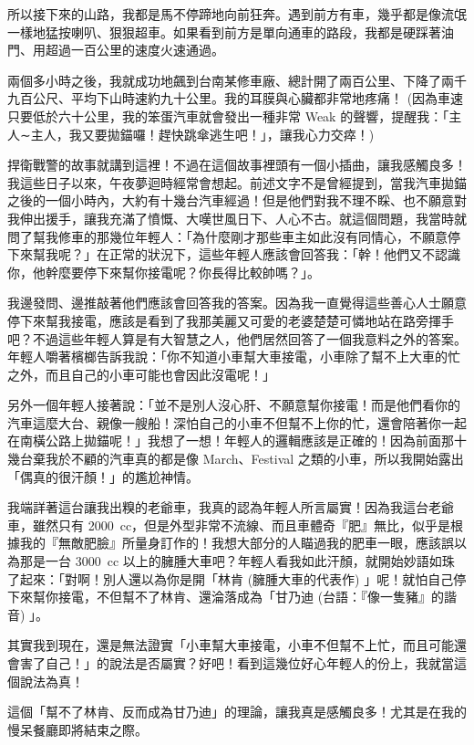 所以接下來的山路，我都是馬不停蹄地向前狂奔。遇到前方有車，幾乎都是像流氓一樣地猛按喇叭、狠狠超車。如果看到前方是單向通車的路段，我都是硬踩著油門、用超過一百公里的速度火速通過。

兩個多小時之後，我就成功地飆到台南某修車廠、總計開了兩百公里、下降了兩千九百公尺、平均下山時速約九十公里。我的耳膜與心臟都非常地疼痛！ (因為車速只要低於六十公里，我的笨蛋汽車就會發出一種非常 Weak 的聲響，提醒我：「主人∼主人，我又要拋錨囉！趕快跳傘逃生吧！」，讓我心力交瘁！) 

捍衛戰警的故事就講到這裡！不過在這個故事裡頭有一個小插曲，讓我感觸良多！我這些日子以來，午夜夢迴時經常會想起。前述文字不是曾經提到，當我汽車拋錨之後的一個小時內，大約有十幾台汽車經過！但是他們對我不理不睬、也不願意對我伸出援手，讓我充滿了憤慨、大嘆世風日下、人心不古。就這個問題，我當時就問了幫我修車的那幾位年輕人：「為什麼剛才那些車主如此沒有同情心，不願意停下來幫我呢？」在正常的狀況下，這些年輕人應該會回答我：「幹！他們又不認識你，他幹麼要停下來幫你接電呢？你長得比較帥嗎？」。

我邊發問、邊推敲著他們應該會回答我的答案。因為我一直覺得這些善心人士願意停下來幫我接電，應該是看到了我那美麗又可愛的老婆楚楚可憐地站在路旁揮手吧？不過這些年輕人算是有大智慧之人，他們居然回答了一個我意料之外的答案。年輕人嚼著檳榔告訴我說：「你不知道小車幫大車接電，小車除了幫不上大車的忙之外，而且自己的小車可能也會因此沒電呢！」

另外一個年輕人接著說：「並不是別人沒心肝、不願意幫你接電！而是他們看你的汽車這麼大台、親像一艘船！深怕自己的小車不但幫不上你的忙，還會陪著你一起在南橫公路上拋錨呢！」我想了一想！年輕人的邏輯應該是正確的！因為前面那十幾台棄我於不顧的汽車真的都是像 March、Festival 之類的小車，所以我開始露出「偶真的很汗顏！」的尷尬神情。

我端詳著這台讓我出糗的老爺車，我真的認為年輕人所言屬實！因為我這台老爺車，雖然只有 2000~cc，但是外型非常不流線、而且車體奇『肥』無比，似乎是根據我的『無敵肥臉』所量身訂作的！我想大部分的人瞄過我的肥車一眼，應該誤以為那是一台 3000~cc 以上的臃腫大車吧？年輕人看我如此汗顏，就開始妙語如珠了起來：「對啊！別人還以為你是開「林肯 (臃腫大車的代表作) 」呢！就怕自己停下來幫你接電，不但幫不了林肯、還淪落成為「甘乃迪 (台語：『像一隻豬』的諧音) 」。

其實我到現在，還是無法證實「小車幫大車接電，小車不但幫不上忙，而且可能還會害了自己！」的說法是否屬實？好吧！看到這幾位好心年輕人的份上，我就當這個說法為真！

這個「幫不了林肯、反而成為甘乃迪」的理論，讓我真是感觸良多！尤其是在我的慢呆餐廳即將結束之際。

